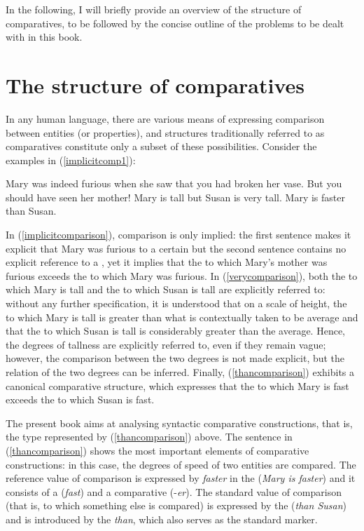In the following, I will briefly provide an overview of the structure of comparatives, to be followed by the concise outline of the problems to be dealt with in this book.

\section{The structure of comparatives} \label{sect:1structure}
In any human language, there are various means of expressing comparison between entities (or properties), and structures traditionally referred to as comparatives constitute only a subset of these possibilities. Consider the examples in (\ref{implicitcomp1}):

\ea \label{implicitcomp1}
\ea Mary was indeed furious when she saw that you had broken her vase. But you should have seen her mother! \label{implicitcomparison}
\ex	Mary is tall but Susan is very tall. \label{verycomparison}
\ex	Mary is faster than Susan. \label{thancomparison}
\z
\z

In (\ref{implicitcomparison}), comparison is only implied: the first sentence makes it explicit that Mary was furious to a certain  but the second sentence contains no explicit reference to a , yet it implies that the  to which Mary's mother was furious exceeds the  to which Mary was furious. In (\ref{verycomparison}), both the  to which Mary is tall and the  to which Susan is tall are explicitly referred to: without any further specification, it is understood that on a scale of height, the  to which Mary is tall is greater than what is contextually taken to be average and that the  to which Susan is tall is considerably greater than the average. Hence, the degrees of tallness are explicitly referred to, even if they remain vague; however, the comparison between the two degrees is not made explicit, but the relation of the two degrees can be inferred. Finally, (\ref{thancomparison}) exhibits a canonical comparative structure, which expresses that the  to which Mary is fast exceeds the  to which Susan is fast.

The present book aims at analysing syntactic comparative constructions, that is, the type represented by (\ref{thancomparison}) above. The sentence in (\ref{thancomparison}) shows the most important elements of comparative constructions: in this case, the degrees of speed of two entities are compared. The reference value of comparison is expressed by \textit{faster} in the  (\textit{Mary is faster}) and it consists of a  (\textit{fast}) and a comparative  (-\textit{er}). The standard value of comparison (that is, to which something else is compared) is expressed by the  (\textit{than Susan}) and is introduced by the  \textit{than}, which also serves as the standard marker.


